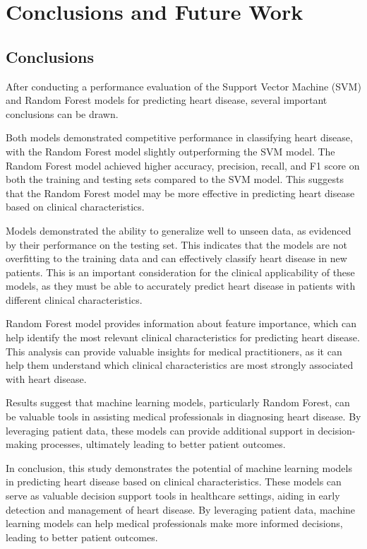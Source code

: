 \chapter{Conclusions and Future Work}
\label{ch:con}
\section{Conclusions}
After conducting a performance evaluation of the Support Vector Machine (SVM) and Random Forest models for predicting heart disease, several important conclusions can be drawn.

Both models demonstrated competitive performance in classifying heart disease, with the Random Forest model slightly outperforming the SVM model. The Random Forest model achieved higher accuracy, precision, recall, and F1 score on both the training and testing sets compared to the SVM model. This suggests that the Random Forest model may be more effective in predicting heart disease based on clinical characteristics.

Models demonstrated the ability to generalize well to unseen data, as evidenced by their performance on the testing set. This indicates that the models are not overfitting to the training data and can effectively classify heart disease in new patients. This is an important consideration for the clinical applicability of these models, as they must be able to accurately predict heart disease in patients with different clinical characteristics.

 Random Forest model provides information about feature importance, which can help identify the most relevant clinical characteristics for predicting heart disease. This analysis can provide valuable insights for medical practitioners, as it can help them understand which clinical characteristics are most strongly associated with heart disease.

Results suggest that machine learning models, particularly Random Forest, can be valuable tools in assisting medical professionals in diagnosing heart disease. By leveraging patient data, these models can provide additional support in decision-making processes, ultimately leading to better patient outcomes.


In conclusion, this study demonstrates the potential of machine learning models in predicting heart disease based on clinical characteristics. These models can serve as valuable decision support tools in healthcare settings, aiding in early detection and management of heart disease. By leveraging patient data, machine learning models can help medical professionals make more informed decisions, leading to better patient outcomes.


